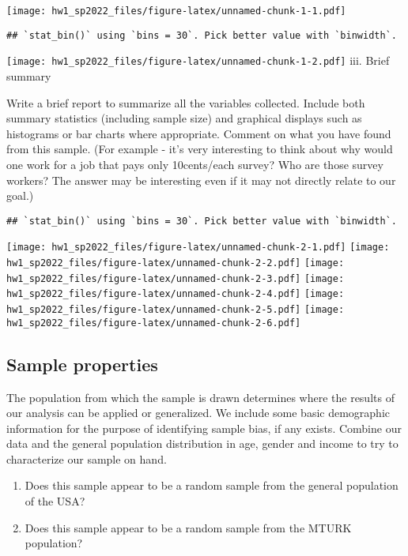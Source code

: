 \documentclass[
]{article}
\providecommand{\tightlist}{%
  \setlength{\itemsep}{0pt}\setlength{\parskip}{0pt}}
\begin{document}
\texttt{[image: hw1\_sp2022\_files/figure-latex/unnamed-chunk-1-1.pdf]}

\begin{verbatim}
## `stat_bin()` using `bins = 30`. Pick better value with `binwidth`.
\end{verbatim}

\texttt{[image: hw1\_sp2022\_files/figure-latex/unnamed-chunk-1-2.pdf]}
iii. Brief summary

Write a brief report to summarize all the variables collected. Include
both summary statistics (including sample size) and graphical displays
such as histograms or bar charts where appropriate. Comment on what you
have found from this sample. (For example - it's very interesting to
think about why would one work for a job that pays only 10cents/each
survey? Who are those survey workers? The answer may be interesting even
if it may not directly relate to our goal.)

\begin{verbatim}
## `stat_bin()` using `bins = 30`. Pick better value with `binwidth`.
\end{verbatim}

\texttt{[image: hw1\_sp2022\_files/figure-latex/unnamed-chunk-2-1.pdf]}
\texttt{[image: hw1\_sp2022\_files/figure-latex/unnamed-chunk-2-2.pdf]}
\texttt{[image: hw1\_sp2022\_files/figure-latex/unnamed-chunk-2-3.pdf]}
\texttt{[image: hw1\_sp2022\_files/figure-latex/unnamed-chunk-2-4.pdf]}
\texttt{[image: hw1\_sp2022\_files/figure-latex/unnamed-chunk-2-5.pdf]}
\texttt{[image: hw1\_sp2022\_files/figure-latex/unnamed-chunk-2-6.pdf]}

\hypertarget{sample-properties}{%
\subsection{Sample properties}\label{sample-properties}}

The population from which the sample is drawn determines where the
results of our analysis can be applied or generalized. We include some
basic demographic information for the purpose of identifying sample
bias, if any exists. Combine our data and the general population
distribution in age, gender and income to try to characterize our sample
on hand.

\begin{enumerate}
\def\labelenumi{\roman{enumi}.}
\tightlist
\item
  Does this sample appear to be a random sample from the general
  population of the USA?
\item
  Does this sample appear to be a random sample from the MTURK
  population?
\end{enumerate}
\end{document}
